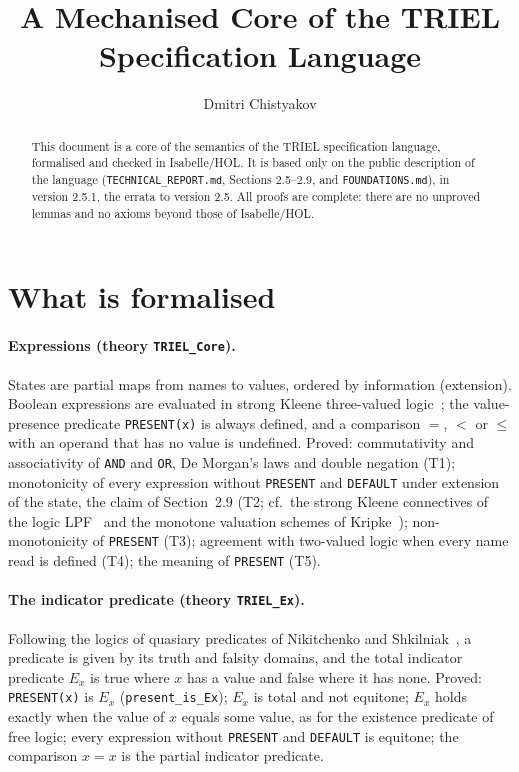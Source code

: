 \documentclass[11pt,a4paper]{article}
\begin{document}
\title{A Mechanised Core of the TRIEL Specification Language}
\author{Dmitri Chistyakov}
\maketitle

\begin{abstract}
This document is a core of the semantics of the TRIEL specification language,
formalised and checked in Isabelle/HOL. It is based only on the public description of
the language (\texttt{TECHNICAL\_REPORT.md}, Sections 2.5--2.9, and
\texttt{FOUNDATIONS.md}), in version 2.5.1, the errata to version 2.5. All proofs are complete: there are no unproved lemmas and no
axioms beyond those of Isabelle/HOL.
\end{abstract}

\section*{What is formalised}

\paragraph{Expressions (theory \texttt{TRIEL\_Core}).}
States are partial maps from names to values, ordered by information (extension).
Boolean expressions are evaluated in strong Kleene three-valued logic~\cite{Kleene1938}; the value-presence
predicate \texttt{PRESENT(x)} is always defined, and a comparison $=$, $<$ or $\le$ with
an operand that has no value is undefined. Proved: commutativity and associativity
of \texttt{AND} and \texttt{OR}, De Morgan's laws and double negation (T1); monotonicity of
every expression without \texttt{PRESENT} and \texttt{DEFAULT} under extension of the
state, the claim of
Section~2.9 (T2; cf.\ the strong Kleene connectives of the logic
LPF~\cite{BarringerChengJones1984} and the monotone valuation schemes of
Kripke~\cite{Kripke1975}); non-monotonicity of \texttt{PRESENT} (T3); agreement with two-valued
logic when every name read is defined (T4); the meaning of \texttt{PRESENT} (T5).

\paragraph{The indicator predicate (theory \texttt{TRIEL\_Ex}).}
Following the logics of quasiary predicates of Nikitchenko and
Shkilniak~\cite{NikitchenkoShkilniak2017,ShkilniakShkilniak2024}, a predicate is
given by its truth and falsity domains, and the total indicator predicate $E_x$ is true
where $x$ has a value and false where it has none. Proved: \texttt{PRESENT(x)} is $E_x$
(\texttt{present\_is\_Ex}); $E_x$ is total and not equitone; $E_x$ holds exactly when the
value of $x$ equals some value, as for the existence predicate of free logic; every
expression without \texttt{PRESENT} and \texttt{DEFAULT} is equitone; the comparison
$x = x$ is the partial
indicator predicate.
\end{document}
